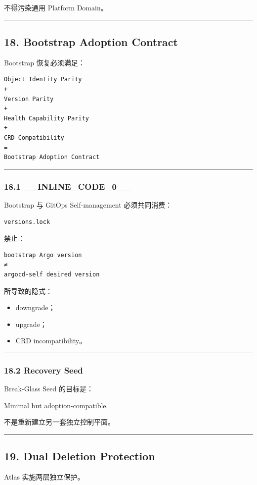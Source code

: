\documentclass[11pt,a4paper]{article}
\begin{document}
不得污染通用 Platform Domain。

\vspace{0.5em}\hrule\vspace{0.5em}
\subsection{18. Bootstrap Adoption Contract}
Bootstrap 恢复必须满足：

\begin{lstlisting}[language=text]
Object Identity Parity
+
Version Parity
+
Health Capability Parity
+
CRD Compatibility
=
Bootstrap Adoption Contract
\end{lstlisting}
\vspace{0.5em}\hrule\vspace{0.5em}
\subsubsection{18.1 \_\_INLINE\_CODE\_0\_\_}
Bootstrap 与 GitOps Self-management 必须共同消费：

\begin{lstlisting}[language=text]
versions.lock
\end{lstlisting}
禁止：

\begin{lstlisting}[language=text]
bootstrap Argo version
≠
argocd-self desired version
\end{lstlisting}
所导致的隐式：

\begin{itemize}
  \item downgrade；
  \item upgrade；
  \item CRD incompatibility。
\end{itemize}
\vspace{0.5em}\hrule\vspace{0.5em}
\subsubsection{18.2 Recovery Seed}
Break-Glass Seed 的目标是：

\begin{gfmBlockquote}
Minimal but adoption-compatible.
\end{gfmBlockquote}
不是重新建立另一套独立控制平面。

\vspace{0.5em}\hrule\vspace{0.5em}
\subsection{19. Dual Deletion Protection}
Atlas 实施两层独立保护。
\end{document}
